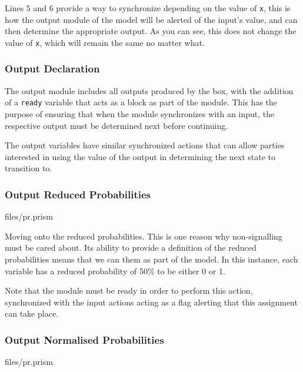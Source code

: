 \documentclass[report.tex]{subfiles}
\begin{document}
Lines 5 and 6 provide a way to synchronize depending on the value of \texttt{x},
this is how the output module of the model will be alerted of the input's value,
and can then determine the appropriate output. As you can see, this does not
change the value of \texttt{x}, which will remain the same no matter what.

\subsubsection{Output Declaration} %
\label{ssub:output_declaration}
 

The output module includes all outputs produced by the box, with the addition of
a \texttt{ready} variable that acts as a block as part of the module. This has
the purpose of ensuring that when the module synchronizes with an input, the
respective output must be determined next before continuing. 

The output variables have similar synchronized actions that can allow parties 
interested in using the value of the output in determining the next state to
transition to.

\subsubsection{Output Reduced Probabilities} %
\label{ssub:output_reduced_probabilities}

{files/pr.prism} 

Moving onto the reduced probabilities. This is one reason why non-signalling
must be cared about. Its ability to provide a definition of the reduced
probabilities means that we can them as part of the model. In this instance,
each variable has a reduced probability of 50\% to be either 0 or 1. 

Note that the module must be ready in order to perform this action, synchronized
with the input actions acting as a flag alerting that this assignment can take
place.

\subsubsection{Output Normalised Probabilities} %
\label{ssub:output_normalised_probabilities}

{files/pr.prism} 
\end{document}
